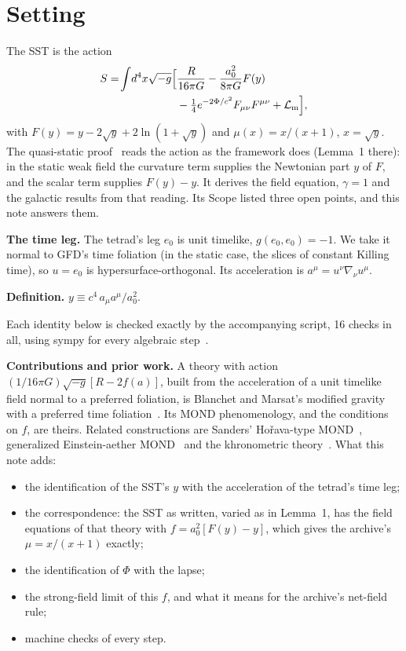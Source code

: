 \documentclass[twocolumn]{iopjournal}
\begin{document}

\section*{Setting}

The SST is the action~\cite{NelsonL3,NelsonL3supp,NelsonII}
\begin{equation}
\begin{aligned}
S = \!\int\! d^4x\sqrt{-g}\Big[&\frac{R}{16\pi G} - \frac{a_0^2}{8\pi G}F(y)\\
&- \tfrac14 e^{-2\Phi/c^2}F_{\mu\nu}F^{\mu\nu} + \mathcal L_{\rm m}\Big],
\end{aligned}
\label{eq:sst}
\end{equation}
with $F(y) = y - 2\sqrt y + 2\ln(1+\sqrt y)$ and
$\mu(x) = x/(x+1)$, $x = \sqrt y$. The quasi-static
proof~\cite{NelsonPqs} reads the action as the framework does
(Lemma~1 there): in the static weak field the curvature term supplies
the Newtonian part $y$ of $F$, and the scalar term supplies
$F(y) - y$. It derives the field equation, $\gamma = 1$ and the
galactic results from that reading. Its Scope listed three open
points, and this note answers them.

\textbf{The time leg.} The tetrad's leg $e_0$ is unit timelike,
$g(e_0,e_0) = -1$. We take it normal to GFD's time foliation (in the
static case, the slices of constant Killing time), so $u = e_0$ is
hypersurface-orthogonal. Its acceleration is
$a^\mu = u^\nu\nabla_\nu u^\mu$.

\textbf{Definition.} \(y \equiv c^4\, a_\mu a^\mu / a_0^2.\)

Each identity below is checked exactly by the accompanying script, 16
checks in all, using sympy for every algebraic
step~\cite{NelsonScript}.

\textbf{Contributions and prior work.} A theory with action
$(1/16\pi G)\sqrt{-g}[R - 2f(a)]$, built from the acceleration of a
unit timelike field normal to a preferred foliation, is Blanchet and
Marsat's modified gravity with a preferred time
foliation~\cite{BM2011,BM2012}. Its MOND phenomenology, and the
conditions on $f$, are theirs. Related constructions are Sanders'
Ho\v{r}ava-type MOND~\cite{Sanders2011}, generalized Einstein-aether
MOND~\cite{ZFS2007} and the khronometric theory~\cite{BPS2011}. What
this note adds:
\begin{itemize}
\item the identification of the SST's $y$ with the acceleration of the
tetrad's time leg;
\item the correspondence: the SST as written, varied as in Lemma~1,
has the field equations of that theory with
$f = a_0^2[F(y) - y]$, which gives the archive's $\mu = x/(x+1)$
exactly;
\item the identification of $\Phi$ with the lapse;
\item the strong-field limit of this $f$, and what it means for the
archive's net-field rule;
\item machine checks of every step.
\end{itemize}
\end{document}
